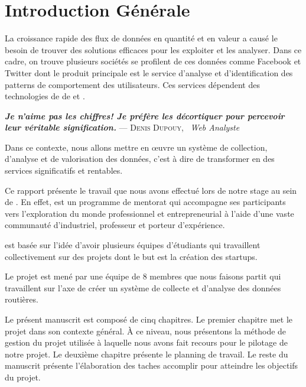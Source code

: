\chapter*{Introduction Générale}

La croissance rapide des flux de données en quantité et en valeur a causé le
besoin de trouver des solutions efficaces pour les exploiter et les analyser.
Dans ce cadre, on trouve plusieurs sociétés se profilent de ces données comme
Facebook et Twitter dont le produit principale est le service d'analyse et
d'identification des patterns de comportement des utilisateurs. Ces services
dépendent des technologies de de  et .


\begin{center}
\textbf{\textit{Je n’aime pas les chiffres! Je préfère les décortiquer pour
percevoir leur véritable signification.}} \linebreak
\hfill --- \textsc{Denis Dupouy}, \ \textit{Web Analyste}
\end{center}

Dans ce contexte, nous allons mettre en \oe{}uvre un système de collection,
d'analyse et de valorisation des données, c'est à dire de transformer en des
services significatifs et rentables.

Ce rapport présente le travail que nous avons effectué lors de notre stage au
sein de . En effet,  est
un programme de mentorat qui accompagne ses participants vers l'exploration du
monde professionnel et entrepreneurial à l'aide d'une vaste communauté
d'industriel, professeur et porteur d'expérience.

 est basée sur l'idée d'avoir plusieurs équipes
d'étudiants qui travaillent collectivement sur des projets dont le but est la
création des startups.

Le projet  est mené par une équipe de 8 membres que nous
faisons partit qui travaillent sur l'axe de créer un système de collecte et
d'analyse des données routières.

Le présent manuscrit est composé de cinq chapitres. Le premier chapitre met le
projet dans son contexte général. À ce niveau, nous présentons la méthode de
gestion du projet utilisée à laquelle nous avons fait recours pour le pilotage
de notre projet. Le deuxième chapitre présente le planning de travail.  Le
reste du manuscrit présente l'élaboration des taches accomplir pour atteindre
les objectifs du projet.
